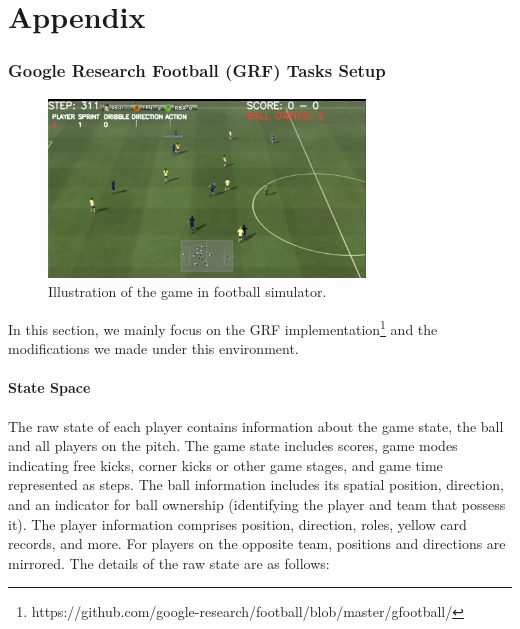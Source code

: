 \newpage
\appendix


\renewcommand{\thepart}{}
\renewcommand{\partname}{}

\part{\huge{\textbf{Appendix}}} %
\parttoc %
\clearpage


\section{Google Research Football (GRF) Tasks Setup}
\label{app:grf}

\begin{figure}[h]
    \centering
    \includegraphics[width=0.75\textwidth]{fig/football_main.png}
    \caption{Illustration of the game in football simulator.}
    \label{fig:football_main}
\end{figure}


In this section, we mainly focus on the GRF implementation\footnote{https://github.com/google-research/football/blob/master/gfootball/} and the modifications we made under this environment. 
\subsection{State Space}


The raw state of each player contains information about the game state, the ball and all players on the pitch. The game state includes scores, game modes indicating free kicks, corner kicks or other game stages, and game time represented as steps. The ball information includes its spatial position, direction, and an indicator for ball ownership (identifying the player and team that possess it). The player information comprises position, direction, roles, yellow card records, and more. For players on the opposite team, positions and directions are mirrored. The details of the raw state are as follows:

